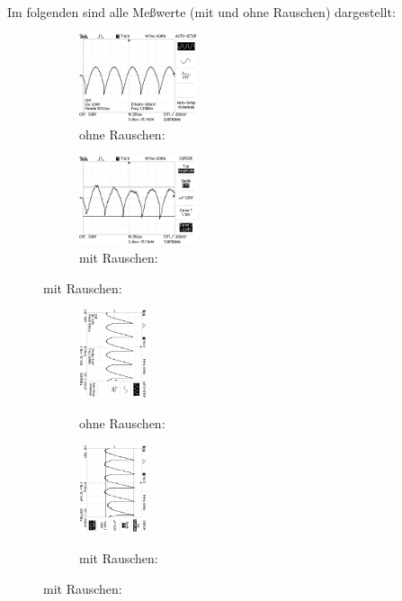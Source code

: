 Im folgenden sind alle Meßwerte (mit und ohne Rauschen) dargestellt:
\begin{figure}
  \caption{$U_{out} ( \phi = 0°$) }
  \centering

  \begin{subfigure}{0.48\textwidth}
      \centering
      \caption{ohne Rauschen:}
      \includegraphics[angle=90,height=2.6cm]{graphics/ALL0031/F0031TEK.jpg}
  \end{subfigure}
  \begin{subfigure}{0.48\textwidth}
      \centering
      \caption{mit Rauschen:}
      \includegraphics[angle=90,height=2.6cm]{graphics/ALL0039/F0039TEK.jpg}
  \end{subfigure}

\end{figure}

\begin{figure}
\caption{$U_{out} (\phi = 135°$)}
\begin{subfigure}{0.48\textwidth}
\centering
\caption{ohne Rauschen:}
\includegraphics[angle=90,height=2.6cm]{graphics/ALL0032/F0032TEK.jpg}
\label{fig:phi135o}
\end{subfigure}
\begin{subfigure}{0.48\textwidth}
\centering
\caption{mit Rauschen:}
\includegraphics[angle=90,height=2.6cm]{graphics/ALL0040/F0040TEK.jpg}
\label{fig:phi135m}
\end{subfigure}
\end{figure}

